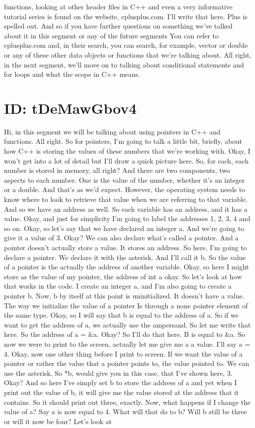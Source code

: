 \documentclass[10pt]{article}
\begin{document}
functions, looking at other header files in C++ and even a very informative tutorial series is found on the website, cplusplus.com. I'll write that here. Plus is spelled out. And so if you have further questions on something we've talked about it in this segment or any of the future segments You can refer to cplusplus.com and, in their search, you can search, for example, vector or double or any of these other data objects or functions that we're talking about. All right, in the next segment, we'll move on to talking about conditional statements and for loops and what the scope in C++ means.

\section*{ID: tDeMawGbov4}
Hi, in this segment we will be talking about using pointers in C++ and functions. All right. So for pointers, I'm going to talk a little bit, briefly, about how C++ is storing the values of these numbers that we're working with. Okay, I won't get into a lot of detail but I'll draw a quick picture here. So, for each, each number is stored in memory, all right? And there are two components, two aspects to each number. One is the value of the number, whether it's an integer or a double. And that's as we'd expect. However, the operating system needs to know where to look to retrieve that value when we are referring to that variable. And so we have an address as well. So each variable has an address, and it has a value. Okay, and just for simplicity I'm going to label the addresses 1, 2, 3, 4 and so on. Okay, so let's say that we have declared an integer a. And we're going to give it a value of 3. Okay? We can also declare what's called a pointer. And a pointer doesn't actually store a value. It stores an address. So here, I'm going to declare a pointer. We declare it with the asterisk. And I'll call it b. So the value of a pointer is the actually the address of another variable. Okay, so here I might store as the value of my pointer, the address of int a okay. So let's look at how that works in the code. I create an integer a, and I'm also going to create a pointer b. Now, b by itself at this point is uninitialized. It doesn't have a value. The way we initialize the value of a pointer Is through a none pointer element of the same type. Okay, so I will say that b is equal to the address of a. So if we want to get the address of a, we actually use the ampersand. So let me write that here. So the address of a = \&a. Okay? So I'll do that here. B is equal to \&a. So now we were to print to the screen, actually let me give me a a value. I'll say a = 4. Okay, now one other thing before I print to screen. If we want the value of a pointer or rather the value that a pointer points to, the value pointed to. We can use the asterisk. So *b, would give you in this case, that I've shown here, 3. Okay? And so here I've simply set b to store the address of a and yet when I print out the value of b, it will give me the value stored at the address that it contains. So it should print out three, exactly. Now, what happens if I change the value of a? Say a is now equal to 4. What will that do to b? Will b still be three or will it now be four? Let's look at 
\end{document}

